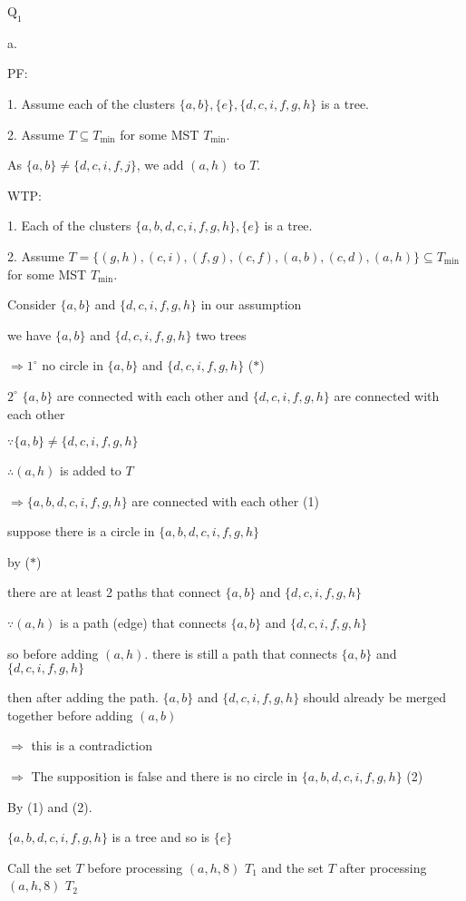\documentclass[12pt]{article}
\begin{document}
$\text{Q}_{1}$

a.

PF:

1. Assume each of the clusters \(\{a,b\}, \{e\}, \{d,c,i,f,g,h\}\) is a tree.

2. Assume \(T \subseteq T_{\min}\) for some MST \(T_{\min}\).

As \(\{a, b\} \neq \{d, c, i, f, j\}\), we add \((a, h)\) to $T$.

WTP:

1. Each of the clusters \(\{a,b,d,c,i,f,g,h\}, \{e\}\) is a tree.

2. Assume \(T = \{ (g,h), (c,i), (f,g), (c,f), (a,b), (c,d) , (a, h)\}\subseteq T_{\min}\) for some MST \(T_{\min}\).

Consider $\{a , b\}$ and $\{ d,c,i,f,g,h \}$ in our assumption 

we have $\{a , b\}$ and $\{ d,c,i,f,g,h \}$ two trees

$\Rightarrow 1^{\circ}$ no circle in $\{a ,b\}$ and $\{ d,c,i,f,g,h \}$ ($*$)

$2^{\circ}$ $\{a , b\}$ are connected with each other and $\{ d,c,i,f,g,h \}$ are connected with each other

$\because\{a, b\} \neq \{ d,c,i,f,g,h \}$

$\therefore(a, h) $ is added to $T$

$\Rightarrow\{a,b,d,c,i,f,g,h\}$ are connected with each other (1) 

suppose there is a circle in $\{a,b,d,c,i,f,g,h\}$

by ($*$)

there are at least 2 paths that connect $\{a,b\}$ and $\{d,c,i,f,g,h \}$

$\because(a,h)$ is a path (edge) that connects $\{a,b\}$ and $\{d,c,i,f,g,h \}$

so before adding $(a, h)$. there is still a path that connects $\{a,b\}$ and $\{d,c,i,f,g,h \}$

then after adding the path. $\{a, b\}$ and $\{d,c,i,f,g,h \}$ should already be merged together before adding $(a,b)$

$\Rightarrow$ this is a contradiction

$\Rightarrow$ The supposition is false and there is no circle in $\{a,b,d,c,i,f,g,h \}$ (2) 

By (1) and (2).

$\{a,b,d,c,i,f,g,h \}$ is a tree and so is $\{e\}$

Call the set $T$ before processing $(a,h,8)$ $T_1$ and the set $T$ after processing $(a,h,8)$ $T_2$
\end{document}
